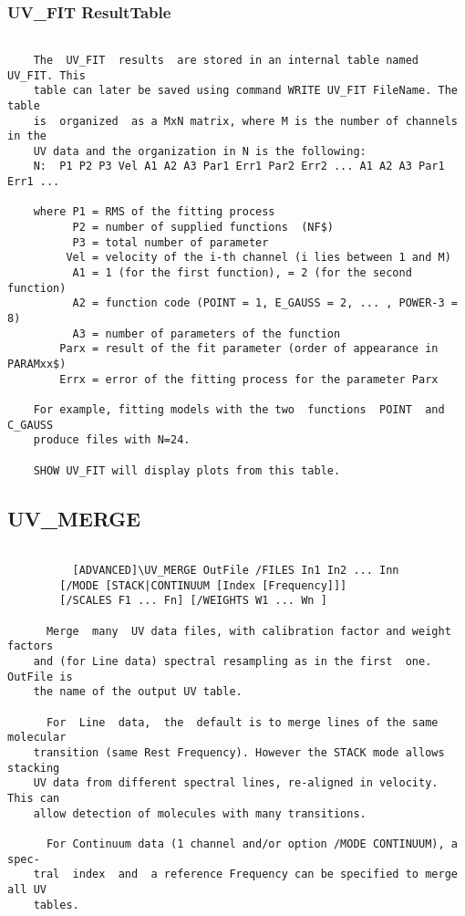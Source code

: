 \subsubsection{UV\_FIT ResultTable}
\begin{verbatim}

    The  UV_FIT  results  are stored in an internal table named UV_FIT. This
    table can later be saved using command WRITE UV_FIT FileName. The  table
    is  organized  as a MxN matrix, where M is the number of channels in the
    UV data and the organization in N is the following:
    N:  P1 P2 P3 Vel A1 A2 A3 Par1 Err1 Par2 Err2 ... A1 A2 A3 Par1 Err1 ...

    where P1 = RMS of the fitting process
          P2 = number of supplied functions  (NF$)
          P3 = total number of parameter
         Vel = velocity of the i-th channel (i lies between 1 and M)
          A1 = 1 (for the first function), = 2 (for the second function)
          A2 = function code (POINT = 1, E_GAUSS = 2, ... , POWER-3 = 8)
          A3 = number of parameters of the function
        Parx = result of the fit parameter (order of appearance in PARAMxx$)
        Errx = error of the fitting process for the parameter Parx

    For example, fitting models with the two  functions  POINT  and  C_GAUSS
    produce files with N=24.

    SHOW UV_FIT will display plots from this table.

\end{verbatim}
\subsection{UV\_MERGE}
\begin{verbatim}

          [ADVANCED]\UV_MERGE OutFile /FILES In1 In2 ... Inn
        [/MODE [STACK|CONTINUUM [Index [Frequency]]]
        [/SCALES F1 ... Fn] [/WEIGHTS W1 ... Wn ]

      Merge  many  UV data files, with calibration factor and weight factors
    and (for Line data) spectral resampling as in the first  one. OutFile is
    the name of the output UV table.

      For  Line  data,  the  default is to merge lines of the same molecular
    transition (same Rest Frequency). However the STACK mode allows stacking
    UV data from different spectral lines, re-aligned in velocity.  This can
    allow detection of molecules with many transitions.

      For Continuum data (1 channel and/or option /MODE CONTINUUM), a  spec-
    tral  index  and  a reference Frequency can be specified to merge all UV
    tables.

\end{verbatim}

